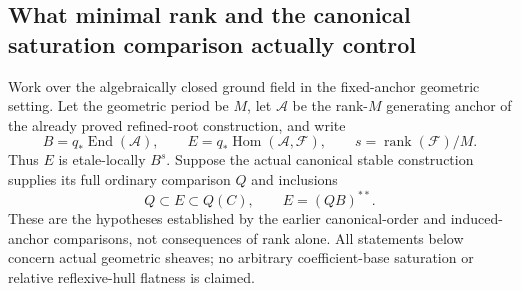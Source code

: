 \subsection*{What minimal rank and the canonical saturation comparison actually control}

Work over the algebraically closed ground field in the fixed-anchor
geometric setting.  Let the geometric period be $M$, let $\mathcal A$
be the rank-$M$ generating anchor of the already proved refined-root
construction, and write
\[
 B=q_*\operatorname{End}(\mathcal A),\qquad
 E=q_*\operatorname{Hom}(\mathcal A,\mathcal F),\qquad
 s=\operatorname{rank}(\mathcal F)/M.
\]
Thus $E$ is etale-locally $B^s$.  Suppose the actual canonical stable
construction supplies its full ordinary comparison $Q$ and inclusions
\[
       Q\subset E\subset Q(C),\qquad E=(QB)^{**}.
\]
These are the hypotheses established by the earlier canonical-order
and induced-anchor comparisons, not consequences of rank alone.
All statements below concern actual geometric sheaves; no arbitrary
coefficient-base saturation or relative reflexive-hull flatness is
claimed.

